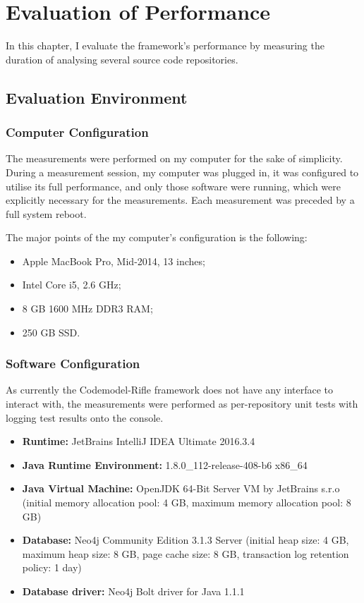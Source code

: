 \chapter{Evaluation of Performance}
\label{chapter:evaluation}

In this chapter, I evaluate the framework's performance by measuring the duration of analysing several source code repositories.


\section{Evaluation Environment}

\subsection{Computer Configuration}

The measurements were performed on my computer for the sake of simplicity. During a measurement session, my computer was plugged in, it was configured to utilise its full performance, and only those software were running, which were explicitly necessary for the measurements. Each measurement was preceded by a full system reboot.

The major points of the my computer's configuration is the following:

\begin{itemize}
\item Apple MacBook Pro, Mid-2014, 13 inches;
\item Intel Core i5, 2.6 GHz;
\item 8 GB 1600 MHz DDR3 RAM;
\item 250 GB SSD.
\end{itemize}


\subsection{Software Configuration}

As currently the Codemodel-Rifle framework does not have any interface to interact with, the measurements were performed as per-repository unit tests with logging test results onto the console.

\begin{itemize}
\item \textbf{Runtime:} JetBrains IntelliJ IDEA Ultimate 2016.3.4
\item \textbf{Java Runtime Environment:} 1.8.0\_112-release-408-b6 x86\_64
\item \textbf{Java Virtual Machine:} OpenJDK 64-Bit Server VM by JetBrains s.r.o (initial memory allocation pool: 4 GB, maximum memory allocation pool: 8 GB)
\item \textbf{Database:} Neo4j Community Edition 3.1.3 Server (initial heap size: 4 GB, maximum heap size: 8 GB, page cache size: 8 GB, transaction log retention policy: 1 day)
\item \textbf{Database driver:} Neo4j Bolt driver for Java 1.1.1
\end{itemize}

